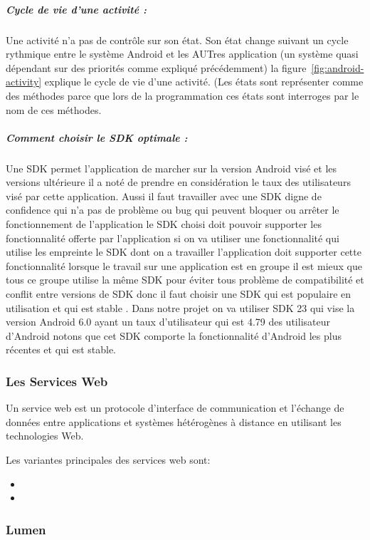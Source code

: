 \subparagraph{Cycle de vie d'une activité :}
Une activité n'a pas de contrôle sur son état.
Son état change suivant un cycle rythmique entre le système Android et les
AUTres application (un système quasi dépendant sur des priorités comme expliqué
précédemment) la figure~\ref{fig:android-activity} explique le cycle de vie
d'une activité. (Les états sont représenter comme des méthodes parce que lors de
la programmation ces états sont interroges par le nom de ces méthodes.


\subparagraph{Comment choisir le SDK optimale :}
Une SDK permet l'application de marcher sur la version Android visé
et les versions ultérieure il  a noté de prendre en considération le taux des
utilisateurs visé par cette application. Aussi il faut travailler avec une SDK
digne de confidence qui n'a pas de problème ou bug qui peuvent  bloquer ou arrêter
le fonctionnement de l'application le SDK choisi doit pouvoir supporter les
fonctionnalité offerte par l'application si on va utiliser une fonctionnalité
qui utilise les empreinte le SDK dont on a travailler l'application doit supporter
cette fonctionnalité lorsque le travail sur une application est en groupe il est
mieux que tous ce groupe utilise la même SDK pour éviter tous problème de
compatibilité et conflit entre versions de SDK  donc il faut choisir une SDK
qui est populaire en utilisation et qui est stable . Dans notre projet on va
utiliser SDK 23 qui vise la version Android 6.0 ayant un taux d'utilisateur
qui est 4.79 %
des utilisateur d'Android notons que cet SDK comporte
la fonctionnalité d'Android les plus récentes et qui est stable.

\subsubsection{Les Services Web}

Un service web est un protocole d'interface de communication et l'échange de
données entre applications et systèmes hétérogènes à distance en utilisant les
technologies Web.

Les variantes principales des services web sont:
\begin{itemize}
        \item {}
        \item {}
\end{itemize}

\subsubsection{Lumen}

